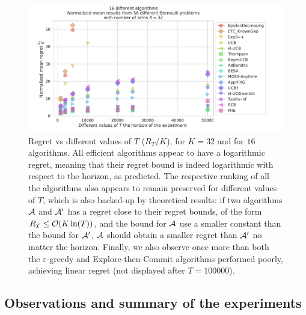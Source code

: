 \begin{figure}[h!]  %
	\includegraphics[width=1.10\linewidth]{16_different_algorithms__normregret_vs_horizons__56pb__K32_7Ts.pdf}
	\caption[Regret vs different values of $T$.]{
        Regret vs different values of $T$ ($R_T / K$),
        for $K=32$ and for $16$ algorithms.
        All efficient algorithms appear to have a logarithmic regret, meaning that their regret bound is indeed logarithmic with respect to the horizon, as predicted.
        The respective ranking of all the algorithms also appears to remain preserved for different values of $T$, which is also backed-up by theoretical results: if two algorithms $\mathcal{A}$ and $\mathcal{A}'$ has a regret close to their regret bounds, of the form $R_T \leq \mathcal{O}(K \ln(T))$, and the bound for $\mathcal{A}$ use a smaller constant than the bound for $\mathcal{A}'$, $\mathcal{A}$ should obtain a smaller regret than $\mathcal{A}'$ no matter the horizon.
        Finally, we also observe once more than both the $\varepsilon$-greedy and Explore-then-Commit algorithms performed poorly, achieving linear regret (not displayed after $T=100000$).
	}
	\label{fig:3:16_different_algorithms__normregret_vs_horizons__56pb__K32_7Ts}
\end{figure}


\subsection{Observations and summary of the experiments}





